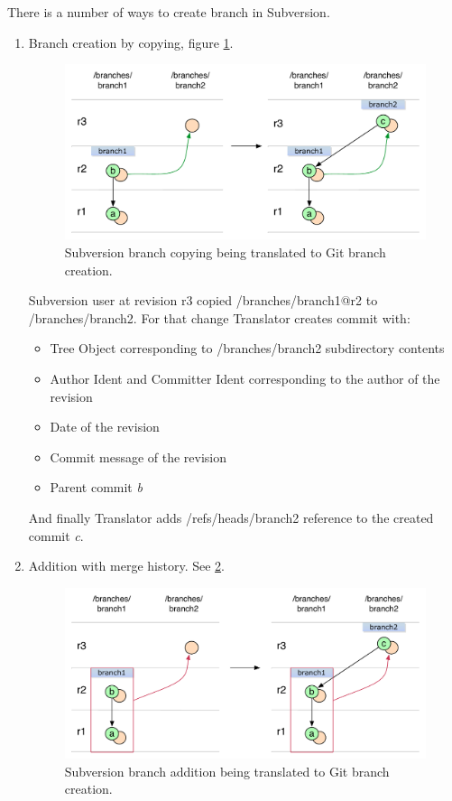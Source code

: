 There is a number of ways to create branch in Subversion.

\begin{enumerate}
\compactlist
\item Branch creation by copying, figure \ref{svn_branch_creation}.

\begin{figure}[!h]
\label{svn_branch_creation}
\centering
\includegraphics[width=\linewidth]{img/diagrams/branch_creation_svn_to_git.pdf}
\caption{Subversion branch copying being translated to Git branch creation.}
\end{figure}

Subversion user at revision r3 copied /branches/branch1@r2 to /branches/branch2. For that change Translator creates commit with:
\begin{itemize}
	\item Tree Object corresponding to /branches/branch2 subdirectory contents
	\item Author Ident and Committer Ident corresponding to the author of the revision
	\item Date of the revision
	\item Commit message of the revision
	\item Parent commit \emph{b}
\end{itemize}
And finally Translator adds /refs/heads/branch2 reference to the created commit \emph{c}.

\item Addition with merge history. See \ref{svn_branch_creation_from_mergeinfo}.

\begin{figure}[!h]
\label{svn_branch_creation_from_mergeinfo}
\centering
\includegraphics[width=\linewidth]{img/diagrams/branch_creation_from_mergeinfo_svn_to_git.pdf}
\caption{Subversion branch addition being translated to Git branch creation.}
\end{figure}


\end{enumerate}
